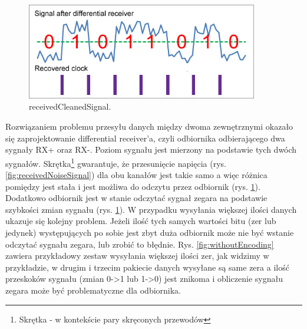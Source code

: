 \documentclass{BscUS}
\begin{document}
\begin{figure}[H]
\centering
\includegraphics[width=0.9\textwidth]{./img/receivedCleanedSignal}
\caption{receivedCleanedSignal.}
\label{fig:receivedCleanedSignal}
\end{figure}
\noindent Rozwiązaniem problemu przesyłu danych między dwoma zewnętrznymi okazało się zaprojektowanie differential receiver'a, czyli odbiornika odbierającego dwa sygnały RX+ oraz RX-. Poziom sygnału jest mierzony na podstawie tych dwóch sygnałów. Skrętka\footnote{Skrętka - w kontekście pary skręconych przewodów} gwarantuje, że przesunięcie napięcia (rys. \ref{fig:receivedNoiseSignal}) dla obu kanałów jest takie samo a więc różnica pomiędzy jest stała i jest możliwa do odczytu przez odbiornik (rys. \ref{fig:receivedCleanedSignal}). Dodatkowo odbiornik jest w stanie odczytać sygnał zegara na podstawie szybkości zmian sygnału (rys. \ref{fig:receivedCleanedSignal}).
\newline
\indent W przypadku wysyłania większej ilości danych ukazuje się kolejny problem. Jeżeli ilość tych samych wartości bitu (zer lub jedynek) występujących po sobie jest zbyt duża odbiornik może nie być wstanie odczytać sygnału zegara, lub zrobić to błędnie. Rys. \ref{fig:withoutEncoding} zawiera przykładowy zestaw wysyłania większej ilości zer, jak widzimy w przykładzie, w drugim i trzecim pakiecie danych wysyłane są same zera a ilość przeskoków sygnału (zmian 0->1 lub 1->0) jest znikoma i obliczenie sygnału zegara może być problematyczne dla odbiornika.
\end{document}
